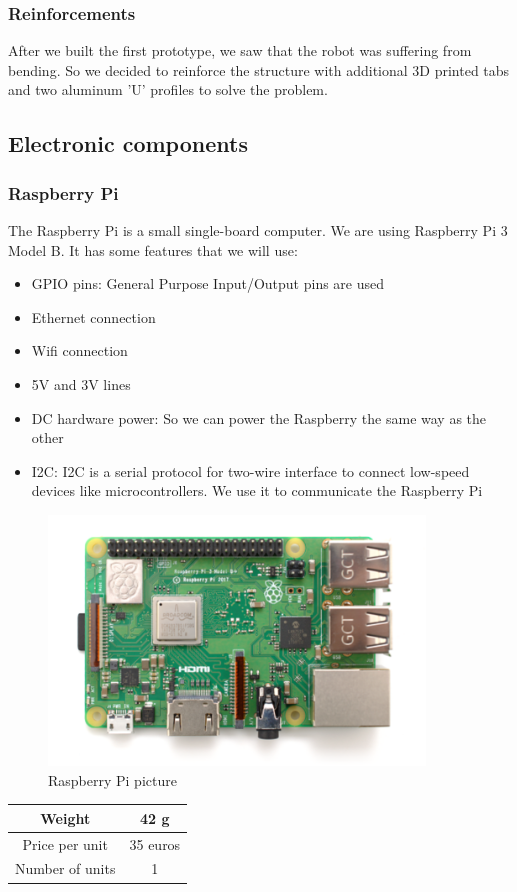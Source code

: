 \subsubsection{Reinforcements}
After we built the first prototype, we saw that the robot was suffering
from bending. So we decided to reinforce the structure with additional 3D
printed tabs and two aluminum 'U' profiles to solve the problem.

\subsection{Electronic components}
\subsubsection{Raspberry Pi}
The Raspberry Pi is a small single-board computer. 
We are using Raspberry Pi 3 Model B. It has some features that we will use:
\begin{itemize}
    \item GPIO pins: General Purpose Input/Output pins are used 
    \item Ethernet connection
    \item Wifi connection
    \item 5V and 3V lines
    \item DC hardware power: So we can power the Raspberry the same way as the
     other
    \item I2C: I2C is a serial protocol for two-wire interface to
    connect low-speed devices like microcontrollers. We use it to communicate
    the Raspberry Pi 
\end{itemize}
\begin{figure}[H]
    \centering
    \includegraphics[width=10cm]{img/components/raspberry_pi.png}
    \caption{Raspberry Pi picture}
    \label{fig:}
\end{figure}
\begin{center}
    \begin{tabular}{ |c|c| }
        \hline
        Weight          & 42 g      \\
        \hline
        Price per unit  & 35 euros \\
        \hline
        Number of units & 1        \\
        \hline
    \end{tabular}
\end{center}
